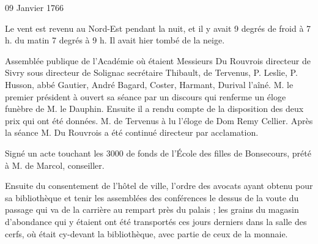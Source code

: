                      \begin{diary}{09 Janvier 1766}{}
                        
                         Le vent est revenu au Nord-Est pendant
                           la
                           nuit, et il y avait 9 degrés de
                              froid à
                           7 h. du
                              matin
                           7 degrés à 9 h. Il avait
                           hier tombé de la neige. \bigskip
        
        
                         Assemblée publique de l'Académie où étaient
                           Messieurs
                           Du Rouvrois
                           directeur
                           de Sivry
                           sous directeur
                           de Solignac
                           secrétaire
                           Thibault, de Tervenus,
                           P. Leslie, P. Husson, abbé
                              Gautier, André
                           Bagard, Coster, Harmant,
                              Durival l'aîné.
                           M. le premier président à ouvert sa séance par
                           un discours qui renferme un éloge funèbre
                           de M. le Dauphin.
                           Ensuite il a rendu
                           compte de la disposition des deux prix
                           qui ont été données. M. de
                              Tervenus à
                           lu l'éloge de Dom Remy
                              Cellier. Après
                           la séance M. Du Rouvrois a
                           été continué
                           directeur par acclamation. \bigskip
        
        
                         Signé un acte touchant les 3000\up{#}
                           de fonds de l'École
                              des filles de Bonsecours, prété à M. de Marcol, conseiller. \bigskip
        
        
                        
                        
                         Ensuite du consentement de l'hôtel de ville,
                           l'ordre des avocats
                           ayant obtenu pour
                           sa bibliothèque et tenir les assemblées des
                           conférences le dessus de la voute du passage
                           qui va de la carrière
                           au rempart près du
                           palais ; les grains du
                           magasin d'abondance
                           qui y étaient ont été transportés ces jours
                           derniers dans la salle des cerfs, où était
                           cy-devant
                           la bibliothèque, avec partie de ceux de
                           la monnaie. \bigskip
        
        
                     \end{diary}

